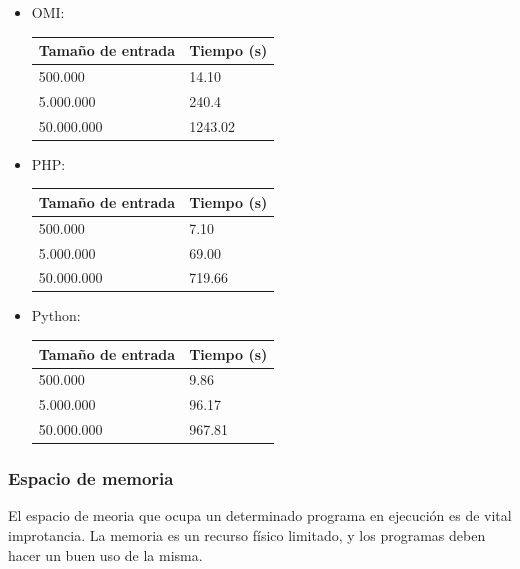 \begin{itemize}
\item OMI: \\
    \FloatBarrier
   \begin{table}[h]
    \begin{center}
   \begin{tabular}{|l|l|} \hline 
   \bf{Tamaño de entrada} & \bf{Tiempo (s)} \\ \hline 
   500.000 & 14.10 \\ \hline 
   5.000.000 &  240.4 \\ \hline
   50.000.000 & 1243.02 \\ \hline 
   \end{tabular}
   \end{center}
   \end{table}
   \FloatBarrier
\item PHP: \\
   \begin{table}[h]
    \begin{center}
   \begin{tabular}{|l|l|} \hline 
   \bf{Tamaño de entrada} & \bf{Tiempo (s)} \\ \hline 
   500.000 & 7.10 \\ \hline 
   5.000.000 & 69.00	 \\ \hline
   50.000.000 & 719.66 \\ \hline 
   \end{tabular}
   \end{center}
   \end{table}
   \FloatBarrier
   \pagebreak
\item Python: \\
   \begin{table}[h]
    \begin{center}
   \begin{tabular}{|l|l|} \hline 
   \bf{Tamaño de entrada} & \bf{Tiempo (s)} \\ \hline 
   500.000 & 9.86	 \\ \hline 
   5.000.000 & 96.17	 \\ \hline
   50.000.000 & 967.81 \\ \hline 
   \end{tabular}
   \end{center}
   \end{table}
   \FloatBarrier
\end{itemize}

\subsubsection{Espacio de memoria}
El espacio de meoria que ocupa un determinado programa en ejecución es de vital improtancia. La memoria es un recurso físico limitado, y los programas deben hacer un buen 
uso de la misma.


